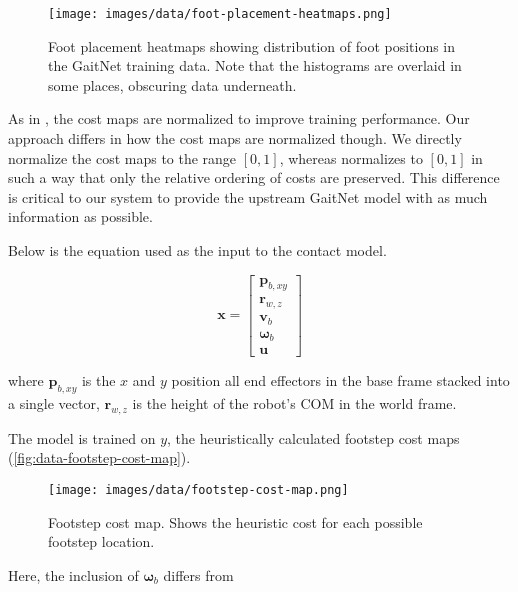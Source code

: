 \begin{figure}
  \centering
  \texttt{[image: images/data/foot-placement-heatmaps.png]}
  \caption{Foot placement heatmaps showing distribution of foot
    positions in the GaitNet training data. Note that the histograms
  are overlaid in some places, obscuring data underneath.}
  \label{fig:data-cn-training-process}
\end{figure}

As in \cite{bratta_contactnet_2024}, the cost maps are normalized to
improve training performance. Our approach differs in how the cost
maps are normalized though. We directly normalize the cost maps to
the range $[0, 1]$, whereas \cite{bratta_contactnet_2024} normalizes
to $[0,1]$ in such a way that only the relative ordering of costs are
preserved. This difference is critical to our system to provide the
upstream GaitNet model with as much information as possible.

Below is the equation used as the input to the contact model.

\[
  \mathbf{x} =
  \begin{bmatrix}
    \mathbf p_{b,xy} \\
    \mathbf r_{w,z} \\
    \mathbf v_b \\
    \mathbf \omega_b \\
    \mathbf u
  \end{bmatrix}
\]

where
$\mathbf p_{b,xy}$ is the $x$ and $y$ position all end effectors in
the base frame stacked into a single vector,
$\mathbf r_{w,z}$ is the height of the robot's COM in the world frame.

The model is trained on $y$, the heuristically calculated footstep
cost maps (\autoref{fig:data-footstep-cost-map}).

\begin{figure}
  \centering
  \texttt{[image: images/data/footstep-cost-map.png]}
  \caption{Footstep cost map. Shows the heuristic cost for each
  possible footstep location.}
  \label{fig:data-footstep-cost-map}
\end{figure}

Here, the inclusion of $\mathbf \omega_b$ differs from
\cite{bratta_contactnet_2024}
